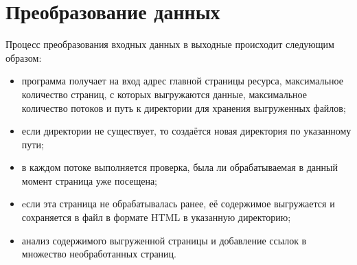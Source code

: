 \chapter{Преобразование данных}

Процесс преобразования входных данных в выходные происходит следующим образом:
\begin{itemize}[label=--]
    \item программа получает на вход адрес главной страницы ресурса, максимальное количество страниц, с которых выгружаются данные, максимальное количество потоков и путь к директории для хранения выгруженных файлов;
    \item если директории не существует, то создаётся новая директория по указанному пути;
    \item в каждом потоке выполняется проверка, была ли обрабатываемая в данный момент страница уже посещена;
    \item eсли эта страница не обрабатывалась ранее, её содержимое выгружается и сохраняется в файл в формате HTML в указанную директорию;
    \item анализ содержимого выгруженной страницы и добавление ссылок в множество необработанных страниц.
\end{itemize}
